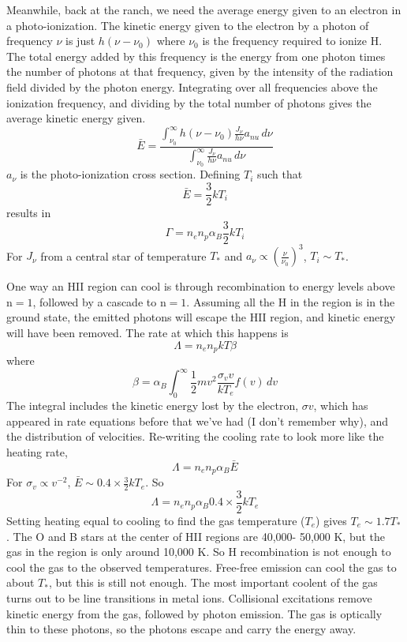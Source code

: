 Meanwhile, back at the ranch, we need the average energy given to an electron 
in a photo-ionization.  The kinetic energy given to the electron by a photon 
of frequency $\nu$ is just $h(\nu-\nu_0)$ where $\nu_0$ is the frequency 
required to ionize H.  The total energy added by this frequency is the 
energy from one photon times the number of photons at that frequency, given 
by the intensity of the radiation field divided by the photon energy.  
Integrating over all frequencies above the ionization frequency, and dividing 
by the total number of photons gives the average kinetic energy given.   
\begin{equation}
\bar{E}=\frac{\int_{\nu_0}^\infty{h(\nu-\nu_0)\frac{J_{\nu}}{h\nu}a_{nu}\,d\nu}}{\int_{\nu_0}^\infty{\frac{J_{\nu}}{h\nu}a_{nu}\,d\nu}}
\end{equation}
$a_{\nu}$ is the photo-ionization cross section.  Defining $T_i$ such that 
\begin{equation}
\bar{E}=\frac{3}{2}kT_i
\end{equation}
results in 
\begin{equation}
\Gamma=n_en_p\alpha_B\frac{3}{2}kT_i
\end{equation}
For $J_{\nu}$ from a central star of temperature $T_*$ and 
$a_{\nu}\propto\left(\frac{\nu}{\nu_0}\right)^3$, $T_i\sim T_*$.

One way an HII region can cool is through recombination to energy levels 
above n$=1$, followed by a cascade to n$=1$.  Assuming all the H in the region 
is in the ground state, the emitted photons will escape the HII region, and 
kinetic energy will have been removed.  The rate at which this happens is 
\begin{equation}
\Lambda=n_en_pkT\beta
\end{equation}
where 
\begin{equation}
\beta=\alpha_B\int_0^\infty{\frac{1}{2}mv^2\frac{\sigma_vv}{kT_e}f(v)\,dv}
\end{equation}
The integral includes the kinetic energy lost by the electron, $\sigma v$, 
which has appeared in rate equations before that we've had (I don't remember 
why), and the distribution of velocities.  Re-writing the cooling rate to 
look more like the heating rate,
\begin{equation}
\Lambda=n_en_p\alpha_B\bar{E}
\end{equation}
For $\sigma_v\propto v^{-2}$, $\bar{E}\sim0.4\times\frac{3}{2}kT_e$.
So
\begin{equation}
\Lambda=n_en_p\alpha_B0.4\times\frac{3}{2}kT_e
\end{equation}
Setting heating equal to cooling to find the gas temperature ($T_e$) gives
$T_e\sim1.7T_*$.  The O and B stars at the center of HII regions are 40,000-
50,000 K, but the gas in the region is only around 10,000 K.  So H 
recombination is not enough to cool the gas to the observed temperatures.  
Free-free emission can cool the gas to about $T_*$, but this is still not 
enough.  The most important coolent of the gas turns out to be line transitions 
in metal ions.  Collisional excitations remove kinetic energy from the gas, 
followed by photon emission.  The gas is optically thin to these photons, 
so the photons escape and carry the energy away.

